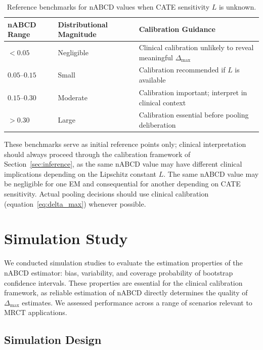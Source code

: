 \documentclass[AMA,Times1COL]{WileyNJDv5}
\begin{document}
\begin{table}[ht]
\caption{Reference benchmarks for nABCD values when CATE sensitivity $L$ is unknown.\label{tab:benchmarks}}
\begin{tabular*}{\textwidth}{@{\extracolsep\fill}lll@{}}
\toprule
\textbf{nABCD Range} & \textbf{Distributional Magnitude} & \textbf{Calibration Guidance} \\
\midrule
$< 0.05$ & Negligible & Clinical calibration unlikely to reveal meaningful $\Delta_{\max}$ \\
$0.05$--$0.15$ & Small & Calibration recommended if $L$ is available \\
$0.15$--$0.30$ & Moderate & Calibration important; interpret in clinical context \\
$> 0.30$ & Large & Calibration essential before pooling deliberation \\
\bottomrule
\end{tabular*}
\begin{tablenotes}
\item These benchmarks serve as initial reference points only; clinical interpretation should always proceed through the calibration framework of Section~\ref{sec:inference}, as the same nABCD value may have different clinical implications depending on the Lipschitz constant $L$. The same nABCD value may be negligible for one EM and consequential for another depending on CATE sensitivity. Actual pooling decisions should use clinical calibration (equation~\ref{eq:delta_max}) whenever possible.
\end{tablenotes}
\end{table}

\section{Simulation Study}\label{sec:simulation}

We conducted simulation studies to evaluate the estimation properties of the nABCD estimator: bias, variability, and coverage probability of bootstrap confidence intervals. These properties are essential for the clinical calibration framework, as reliable estimation of nABCD directly determines the quality of $\Delta_{\max}$ estimates. We assessed performance across a range of scenarios relevant to MRCT applications.

\subsection{Simulation Design}\label{sec:sim_design}
\end{document}
